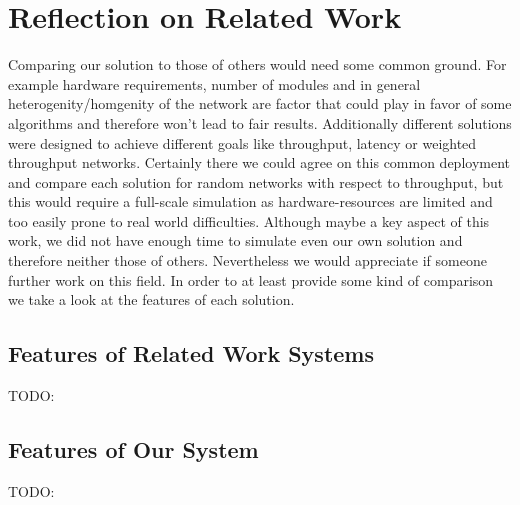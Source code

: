 \section{Reflection on Related Work}
  Comparing our solution to those of others would need some common ground. For example hardware requirements, number of modules and in general heterogenity/homgenity of
  the network are factor that could play in favor of some algorithms and therefore won't lead to fair results. Additionally different solutions were designed to 
  achieve different goals like throughput, latency or weighted throughput networks. Certainly there we could agree on this common deployment and compare each solution for random
  networks with respect to throughput, but this would require a full-scale simulation as hardware-resources are limited and too easily prone to real world difficulties.
  Although maybe a key aspect of this work, we did not have enough time to simulate even our own solution and therefore neither those of others. Nevertheless we would appreciate
  if someone further work on this field. In order to at least provide some kind of comparison we take a look at the features of each solution.
  \subsection{Features of Related Work Systems}
    TODO:
  \subsection{Features of Our System}
    TODO: